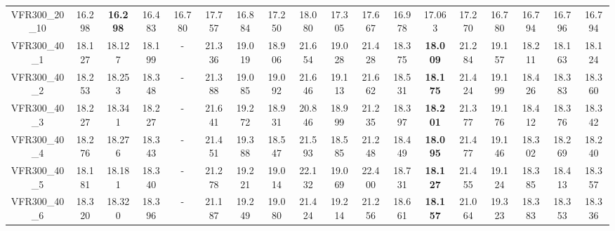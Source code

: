 \begin{tabular}{cc|ccc|ccccccccccccc}
VFR300\_20\_10     & 16.298           & {\bf 16.298}     & 16.483           & 16.780           & 17.757           & 16.884           & 17.250           & 18.080           & 17.305           & 17.667           & 16.978           & 17.063           & 17.270           & 16.780           & 16.794           & 16.796           & 16.794          \\ 
VFR300\_40\_1      & 18.127           & 18.127           & 18.199           & -                & 21.336           & 19.019           & 18.906           & 21.654           & 19.028           & 21.428           & 18.375           & {\bf 18.009}     & 21.284           & 19.157           & 18.211           & 18.163           & 18.124          \\ 
VFR300\_40\_2      & 18.253           & 18.253           & 18.348           & -                & 21.388           & 19.085           & 19.092           & 21.646           & 19.113           & 21.662           & 18.531           & {\bf 18.175}     & 21.424           & 19.199           & 18.426           & 18.383           & 18.360          \\ 
VFR300\_40\_3      & 18.227           & 18.341           & 18.227           & -                & 21.641           & 19.272           & 18.931           & 20.846           & 18.999           & 21.235           & 18.397           & {\bf 18.201}     & 21.377           & 19.176           & 18.412           & 18.376           & 18.342          \\ 
VFR300\_40\_4      & 18.276           & 18.276           & 18.343           & -                & 21.451           & 19.388           & 18.547           & 21.593           & 18.585           & 21.248           & 18.449           & {\bf 18.095}     & 21.477           & 19.146           & 18.302           & 18.269           & 18.240          \\ 
VFR300\_40\_5      & 18.181           & 18.181           & 18.340           & -                & 21.278           & 19.221           & 19.014           & 22.132           & 19.069           & 22.400           & 18.731           & {\bf 18.127}     & 21.455           & 19.124           & 18.385           & 18.413           & 18.357          \\ 
VFR300\_40\_6      & 18.320           & 18.320           & 18.396           & -                & 21.187           & 19.249           & 19.080           & 21.424           & 19.214           & 21.256           & 18.661           & {\bf 18.157}     & 21.064           & 19.323           & 18.383           & 18.353           & 18.336          \\ 

\end{tabular}
